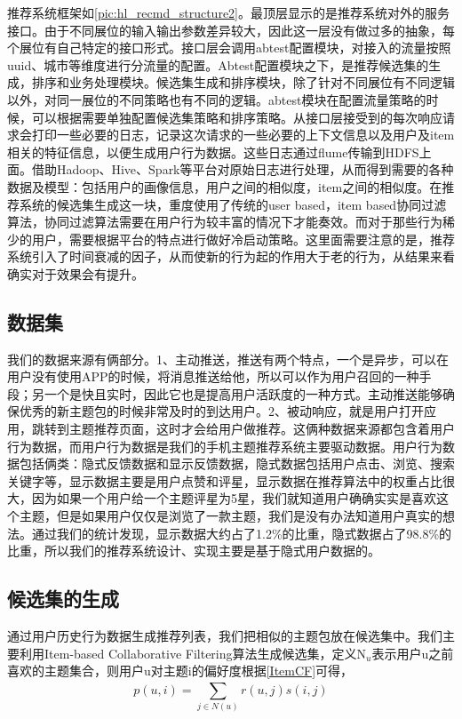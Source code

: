     推荐系统框架如\autoref{pic:hl_recmd_structure2}。最顶层显示的是推荐系统对外的服务接口。由于不同展位的输入输出参数差异较大，因此这一层没有做过多的抽象，每个展位有自己特定的接口形式。接口层会调用abtest配置模块，对接入的流量按照uuid、城市等维度进行分流量的配置。Abtest配置模块之下，是推荐候选集的生成，排序和业务处理模块。候选集生成和排序模块，除了针对不同展位有不同逻辑以外，对同一展位的不同策略也有不同的逻辑。abtest模块在配置流量策略的时候，可以根据需要单独配置候选集策略和排序策略。从接口层接受到的每次响应请求会打印一些必要的日志，记录这次请求的一些必要的上下文信息以及用户及item相关的特征信息，以便生成用户行为数据。这些日志通过flume传输到HDFS上面。借助Hadoop、Hive、Spark等平台对原始日志进行处理，从而得到需要的各种数据及模型：包括用户的画像信息，用户之间的相似度，item之间的相似度。在推荐系统的候选集生成这一块，重度使用了传统的user based，item based协同过滤算法，协同过滤算法需要在用户行为较丰富的情况下才能奏效。而对于那些行为稀少的用户，需要根据平台的特点进行做好冷启动策略。这里面需要注意的是，推荐系统引入了时间衰减的因子，从而使新的行为起的作用大于老的行为，从结果来看确实对于效果会有提升。

    \subsection{数据集}
    我们的数据来源有俩部分。1、主动推送，推送有两个特点，一个是异步，可以在用户没有使用APP的时候，将消息推送给他，所以可以作为用户召回的一种手段；另一个是快且实时，因此它也是提高用户活跃度的一种方式。主动推送能够确保优秀的新主题包的时候非常及时的到达用户。2、被动响应，就是用户打开应用，跳转到主题推荐页面，这时才会给用户做推荐。这俩种数据来源都包含着用户行为数据，而用户行为数据是我们的手机主题推荐系统主要驱动数据。用户行为数据包括俩类：隐式反馈数据和显示反馈数据，隐式数据包括用户点击、浏览、搜索关键字等，显示数据主要是用户点赞和评星，显示数据在推荐算法中的权重占比很大，因为如果一个用户给一个主题评星为5星，我们就知道用户确确实实是喜欢这个主题，但是如果用户仅仅是浏览了一款主题，我们是没有办法知道用户真实的想法。通过我们的统计发现，显示数据大约占了1.2\%的比重，隐式数据占了98.8\%的比重，所以我们的推荐系统设计、实现主要是基于隐式用户数据的。

    \subsection{候选集的生成}
    通过用户历史行为数据生成推荐列表，我们把相似的主题包放在候选集中。我们主要利用Item-based Collaborative Filtering算法生成候选集，定义N$_u$表示用户u之前喜欢的主题集合，则用户u对主题i的偏好度根据\autoref{ItemCF}可得，
    \begin{equation}
    p(u,i)=\sum \limits _{j\in N(u)}^{} r(u,j)s(i,j)
    \label{ItemCF}
    \end{equation}

